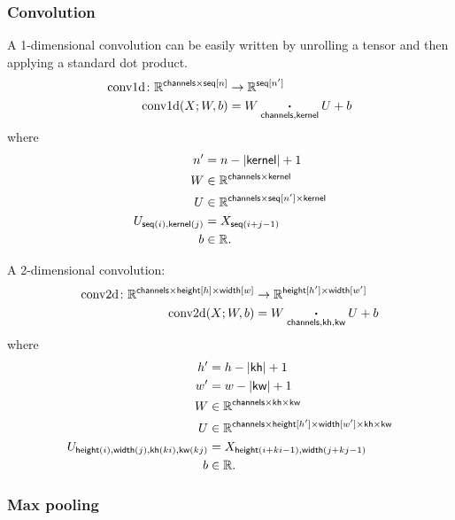 \documentclass{article}
\newcommand{\reals}{\mathbb{R}}
\begin{document}
\subsubsection{Convolution}

A 1-dimensional convolution can be easily written by unrolling a tensor and then
applying a standard dot product.
\begin{align*}
\text{conv1d} \colon \reals^{\name{channels} \times \nset{seq}{n}} &\rightarrow \mathbb{R}^{\nset{seq}{n'}} \\
\text{conv1d}(X; W, b) &= W \ndot{channels, kernel} U + b
\end{align*}
where
\begin{align*}
n' &= n-|\name{kernel}|+1 \\
W &\in \reals^{\name{channels} \times \name{kernel}} \\
U &\in \reals^{\name{channels} \times \nset{seq}{n'} \times \name{kernel}} \\
U_{\nidx{seq}{i}, \nidx{kernel}{j}} & = X_{\nidx{seq}{i+j - 1}} \\
b &\in \reals.
\end{align*} 

A 2-dimensional convolution:
\begin{align*}
  \text{conv2d} \colon \reals^{\name{channels} \times \nset{height}{h} \times \nset{width}{w}} %
  &\rightarrow \reals^{\nset{height}{h'} \times \nset{width}{w'}} \\
  \text{conv2d}(X; W, b) &= W \ndot{channels, kh, kw} U + b
\end{align*}  
where
\begin{align*}
h' &= h-|\name{kh}|+1 \\
w' &= w-|\name{kw}|+1 \\
W &\in \reals^{\name{channels} \times \name{kh} \times \name{kw}} \\
U &\in \reals^{\name{channels} \times \nset{height}{h'} \times \nset{width}{w'} \times \name{kh} \times \name{kw}}  \\
U_{\nidx{height}{i}, \nidx{width}{j}, \nidx{kh}{ki}, \nidx{kw}{kj}} &= X_{\nidx{height}{i+ki-1}, \nidx{width}{j+kj-1}} \\
b &\in \reals.
\end{align*}

\subsubsection{Max pooling}
\end{document}
